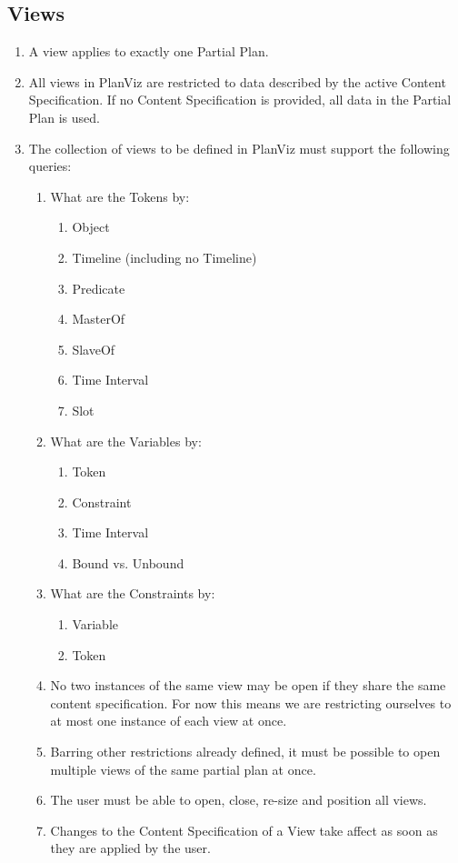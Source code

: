 \documentclass[twoside, 11pt]{article}
\begin{document}
\subsection{Views}
\begin{enumerate}
\item A view applies to exactly one Partial Plan.
\item All views in PlanViz are restricted to data described by the active Content Specification. If no Content Specification is provided, all data in the Partial Plan is used.
\item The collection of views to be defined in PlanViz must support the following queries:
\begin{enumerate}
\item What are the Tokens by:
\begin{enumerate}
\item Object
\item Timeline (including no Timeline)
\item Predicate
\item MasterOf
\item SlaveOf
\item Time Interval
\item Slot
\end{enumerate}
\item What are the Variables by:
\begin{enumerate}
\item Token
\item Constraint
\item Time Interval
\item Bound vs. Unbound
\end{enumerate}
\item What are the Constraints by:
\begin{enumerate}
\item Variable
\item Token
\end{enumerate}
\item No two instances of the same view may be open if they share the same content specification. For now this means we are restricting ourselves to at most one instance of each view at once.
\item Barring other restrictions already defined, it must be possible to open multiple views of the same partial plan at once.
\item The user must be able to open, close, re-size and position all views.
\item Changes to the Content Specification of a View take affect as soon as they are applied by the user.
\end{enumerate}
\end{enumerate}
\end{document}
